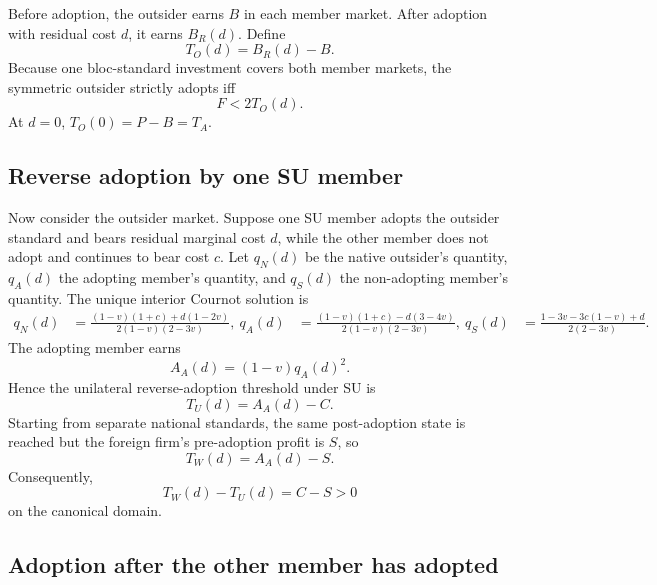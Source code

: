 Before adoption, the outsider earns $B$ in each member market. After adoption with residual cost $d$, it earns $B_R(d)$. Define
\begin{equation}
T_O(d)=B_R(d)-B.
\label{eq:appendix-TOd}
\end{equation}
Because one bloc-standard investment covers both member markets, the symmetric outsider strictly adopts iff
\begin{equation}
F<2T_O(d).
\label{eq:appendix-outsider-partial-threshold}
\end{equation}
At $d=0$, $T_O(0)=P-B=T_A$.

\subsection{Reverse adoption by one SU member}

Now consider the outsider market. Suppose one SU member adopts the outsider standard and bears residual marginal cost $d$, while the other member does not adopt and continues to bear cost $c$. Let $q_N(d)$ be the native outsider's quantity, $q_A(d)$ the adopting member's quantity, and $q_S(d)$ the non-adopting member's quantity. The unique interior Cournot solution is
\begin{align}
q_N(d)
&=
\frac{(1-v)(1+c)+d(1-2v)}
     {2(1-v)(2-3v)},\
q_A(d)
&=
\frac{(1-v)(1+c)-d(3-4v)}
     {2(1-v)(2-3v)},\
q_S(d)
&=
\frac{1-3v-3c(1-v)+d}
     {2(2-3v)}.
\label{eq:appendix-one-adopter-quantities}
\end{align}
The adopting member earns
\[
A_A(d)=(1-v)q_A(d)^2.
\]
Hence the unilateral reverse-adoption threshold under SU is
\begin{equation}
T_U(d)=A_A(d)-C.
\label{eq:appendix-TUd}
\end{equation}
Starting from separate national standards, the same post-adoption state is reached but the foreign firm's pre-adoption profit is $S$, so
\begin{equation}
T_W(d)=A_A(d)-S.
\label{eq:appendix-TWd}
\end{equation}
Consequently,
\begin{equation}
T_W(d)-T_U(d)=C-S>0
\label{eq:appendix-TW-TU-partial}
\end{equation}
on the canonical domain.

\subsection{Adoption after the other member has adopted}

